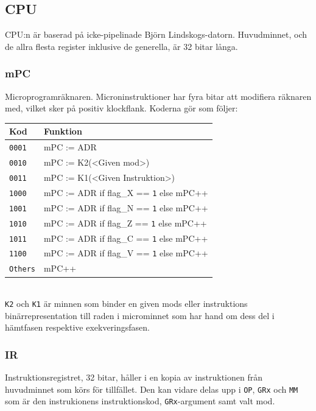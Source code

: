 \documentclass[]{article}
\begin{document}
\subsection{CPU}

CPU:n är baserad på icke-pipelinade Björn Lindskogs-datorn. Huvudminnet, och de allra flesta register inklusive de generella, är 32 bitar långa.

\subsubsection{mPC}

Microprogramräknaren. Microninstruktioner har fyra bitar att modifiera räknaren med, vilket sker på positiv klockflank. Koderna gör som följer:
\\

\begin{tabular}{ll}
	\textbf{Kod}    & \textbf{Funktion}                              \\ \hline
	\texttt{0001}   & mPC := ADR                                     \\
	\texttt{0010}   & mPC := K2(<Given mod>)                         \\
	\texttt{0011}   & mPC := K1(<Given Instruktion>)                 \\
	\texttt{1000}   & mPC := ADR if flag\_X == \texttt{1} else mPC++ \\
	\texttt{1001}   & mPC := ADR if flag\_N == \texttt{1} else mPC++ \\
	\texttt{1010}   & mPC := ADR if flag\_Z == \texttt{1} else mPC++ \\
	\texttt{1011}   & mPC := ADR if flag\_C == \texttt{1} else mPC++ \\
	\texttt{1100}   & mPC := ADR if flag\_V == \texttt{1} else mPC++ \\
	\texttt{Others} & mPC++
\end{tabular}
\\

\noindent
\texttt{K2} och \texttt{K1} är minnen som binder en given mods eller instruktions binärrepresentation till raden i microminnet som har hand om dess del i hämtfasen respektive exekveringsfasen.

\subsubsection{IR}

Instruktionsregistret, 32 bitar, håller i en kopia av instruktionen från huvudminnet som körs för tillfället. Den kan vidare delas upp i \texttt{OP}, \texttt{GRx} och \texttt{MM} som är den instrukionens instruktionskod, \texttt{GRx}-argument samt valt mod.
\end{document}
